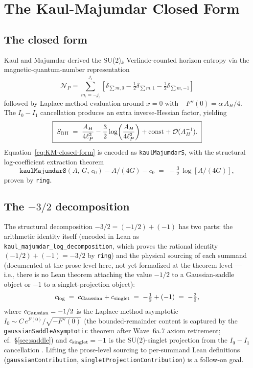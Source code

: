 \documentclass[aps,prd,twocolumn,showpacs,superscriptaddress,nofootinbib]{revtex4-2}
\newcommand{\SBH}{S_{\rm BH}}
\newcommand{\AH}{A_H}
\begin{document}
\section{The Kaul-Majumdar Closed Form}
\label{sec:KM}

\subsection{The closed form}

Kaul and Majumdar \cite{KaulMajumdar2000,Kaul2012Review} derived the
SU(2)$_k$ Verlinde-counted horizon entropy via the magnetic-quantum-number
representation
\begin{equation}
\mathcal{N}_P = \sum_{m_l = -j_l}^{j_l}\!
\left[
\bar\delta_{\sum m, 0} - \tfrac12\bar\delta_{\sum m, 1}
- \tfrac12\bar\delta_{\sum m, -1}
\right]
\label{eq:magnetic-form}
\end{equation}
followed by Laplace-method evaluation around $x = 0$ with
$-F''(0) = \alpha\,\AH/4$. The $I_0 - I_1$ cancellation produces an
extra inverse-Hessian factor, yielding
\begin{equation}
\boxed{\;
\SBH \;=\; \frac{\AH}{4\ell_P^2}
- \frac{3}{2}\log\!\left(\frac{\AH}{4\ell_P^2}\right)
+ \mathrm{const} + \mathcal{O}(\AH^{-1}).
\;}
\label{eq:KM-closed-form}
\end{equation}
Equation~\eqref{eq:KM-closed-form} is encoded as
\texttt{kaulMajumdarS}, with the structural log-coefficient extraction
theorem
\begin{equation}
\texttt{kaulMajumdarS}(A,\,G,\,c_0) - A/(4G) - c_0
\;=\; -\tfrac{3}{2}\,\log[A/(4G)],
\end{equation}
proven by \texttt{ring}.

\subsection{The $-3/2$ decomposition}

The structural decomposition $-3/2 = (-1/2) + (-1)$ has two parts: the
arithmetic identity itself (encoded in Lean as
\texttt{kaul\_majumdar\_log\_decomposition}, which proves the rational
identity $(-1/2) + (-1) = -3/2$ by \texttt{ring}) and the physical
sourcing of each summand (documented at the prose level here, not yet
formalized at the theorem level — i.e., there is no Lean theorem
attaching the value $-1/2$ to a Gaussian-saddle object or $-1$ to a
singlet-projection object):
\begin{equation}
c_{\log} \;=\; c_{\rm Gaussian} + c_{\rm singlet}
\;=\; -\tfrac12 + (-1) \;=\; -\tfrac32,
\end{equation}
where $c_{\rm Gaussian} = -1/2$ is the Laplace-method asymptotic
$I_0 \sim C\,e^{F(0)} / \sqrt{-F''(0)}$ (the bounded-remainder content
is captured by the \texttt{gaussianSaddleAsymptotic} theorem after
Wave~6a.7 axiom retirement; cf.\ \S\ref{sec:saddle}) and
$c_{\rm singlet} = -1$ is the SU(2)-singlet projection from the
$I_0 - I_1$ cancellation \cite{KaulMajumdar2000,Kaul2012Review}.
Lifting the prose-level sourcing to per-summand Lean definitions
(\texttt{gaussianContribution}, \texttt{singletProjectionContribution})
is a follow-on goal.
\end{document}
